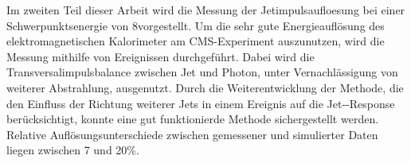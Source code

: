 Im zweiten Teil dieser Arbeit wird die Messung der Jetimpulsaufloesung bei einer Schwerpunktsenergie von 8\tev vorgestellt.
Um die sehr gute Energieaufl\"{o}sung des elektromagnetischen Kalorimeter am CMS-Experiment auszunutzen, wird die Messung mithilfe von \GAMJET Ereignissen durchgef\"{u}hrt.
Dabei wird die Transversalimpulsbalance zwischen Jet und Photon, unter Vernachl\"{a}ssigung von weiterer Abstrahlung, ausgenutzt.
Durch die Weiterentwicklung der Methode, die den Einfluss der Richtung weiterer Jets in einem Ereignis auf die Jet-\pt-Response ber\"{u}cksichtigt, konnte eine gut funktionierde Methode sichergestellt werden.
Relative Aufl\"{o}sungsunterschiede zwischen gemessener und simulierter Daten liegen zwischen 7 und 20\%.

\cleardoublepage
